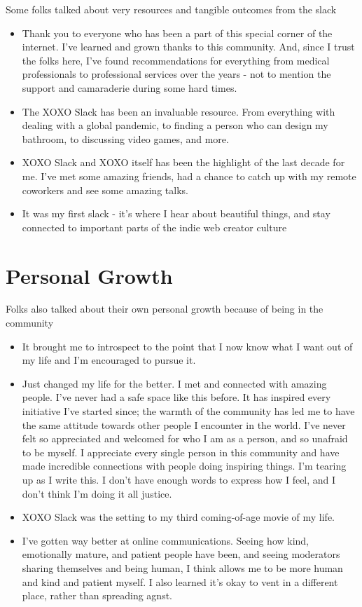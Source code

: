 \documentclass[
]{book}
\providecommand{\tightlist}{%
  \setlength{\itemsep}{0pt}\setlength{\parskip}{0pt}}
\begin{document}
Some folks talked about very resources and tangible outcomes from the slack

\begin{itemize}
\tightlist
\item
  Thank you to everyone who has been a part of this special corner of the internet. I've learned and grown thanks to this community. And, since I trust the folks here, I've found recommendations for everything from medical professionals to professional services over the years - not to mention the support and camaraderie during some hard times.
\item
  The XOXO Slack has been an invaluable resource. From everything with dealing with a global pandemic, to finding a person who can design my bathroom, to discussing video games, and more.
\item
  XOXO Slack and XOXO itself has been the highlight of the last decade for me. I've met some amazing friends, had a chance to catch up with my remote coworkers and see some amazing talks.
\item
  It was my first slack - it's where I hear about beautiful things, and stay connected to important parts of the indie web creator culture
\end{itemize}

\section{Personal Growth}\label{personal-growth}

Folks also talked about their own personal growth because of being in the community

\begin{itemize}
\tightlist
\item
  It brought me to introspect to the point that I now know what I want out of my life and I'm encouraged to pursue it.
\item
  Just changed my life for the better. I met and connected with amazing people. I've never had a safe space like this before. It has inspired every initiative I've started since; the warmth of the community has led me to have the same attitude towards other people I encounter in the world. I've never felt so appreciated and welcomed for who I am as a person, and so unafraid to be myself. I appreciate every single person in this community and have made incredible connections with people doing inspiring things. I'm tearing up as I write this. I don't have enough words to express how I feel, and I don't think I'm doing it all justice.
\item
  XOXO Slack was the setting to my third coming-of-age movie of my life.
\item
  I've gotten way better at online communications. Seeing how kind, emotionally mature, and patient people have been, and seeing moderators sharing themselves and being human, I think allows me to be more human and kind and patient myself. I also learned it's okay to vent in a different place, rather than spreading agnst.
\end{itemize}
\end{document}
